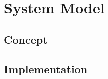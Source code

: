 \section{System Model}
\label{sec:system-model}

\subsection{Concept}
\lipsum[1]

\begin{compactitem}
	\item \lipsum[53]
	\item \lipsum[11]
\end{compactitem}

\lipsum[43]

\subsection{Implementation}
\lipsum[2]
